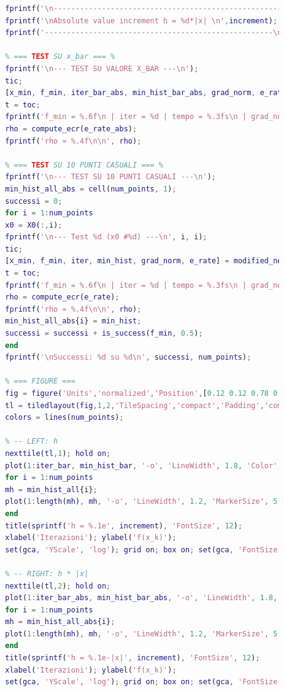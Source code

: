 \documentclass[a4paper,12pt]{article}
\begin{document}
\begin{lstlisting}[language=Matlab,caption={Full script: Modified Newton method on Extended Rosenbrock},label={lst:rosenbrock-extended}]
		% Absolute value increment
		fprintf('\n----------------------------------------------------');
		fprintf('\nAbsolute value increment h = %d*|x| \n',increment);
		fprintf('----------------------------------------------------\n');
		
		% === TEST SU x_bar === %
		fprintf('\n--- TEST SU VALORE X_BAR ---\n');
		tic;
		[x_min, f_min, iter_bar_abs, min_hist_bar_abs, grad_norm, e_rate_abs] = modified_newton(extended_rosenbrock,grad_f,hess_f,x_bar,tol,max_iter,fd,increment,1);
		t = toc;
		fprintf('f_min = %.6f\n | iter = %d | tempo = %.3fs\n | grad_norm = %.6f\n', f_min, iter_bar_abs, t, grad_norm);
		rho = compute_ecr(e_rate_abs); 
		fprintf('rho ≈ %.4f\n\n', rho);
		
		% === TEST SU 10 PUNTI CASUALI === %
		fprintf('\n--- TEST SU 10 PUNTI CASUALI ---\n');
		min_hist_all_abs = cell(num_points, 1);
		successi = 0;
		for i = 1:num_points
		x0 = X0(:,i);
		fprintf('\n--- Test %d (x0 #%d) ---\n', i, i);
		tic;
		[x_min, f_min, iter, min_hist, grad_norm, e_rate] = modified_newton(extended_rosenbrock,grad_f,hess_f,x0,tol,max_iter,fd,increment,1);
		t = toc;
		fprintf('f_min = %.6f\n | iter = %d | tempo = %.3fs\n | grad_norm = %.6f\n', f_min, iter, t, grad_norm);
		rho = compute_ecr(e_rate); 
		fprintf('rho ≈ %.4f\n\n', rho);
		min_hist_all_abs{i} = min_hist;
		successi = successi + is_success(f_min, 0.5);
		end   
		fprintf('\nSuccessi: %d su %d\n', successi, num_points);
		
		% === FIGURE ===
		fig = figure('Units','normalized','Position',[0.12 0.12 0.78 0.62]);
		tl = tiledlayout(fig,1,2,'TileSpacing','compact','Padding','compact');
		colors = lines(num_points);
		
		% -- LEFT: h 
		nexttile(tl,1); hold on;
		plot(1:iter_bar, min_hist_bar, '-o', 'LineWidth', 1.8, 'Color', 'k', 'DisplayName', 'x̄');
		for i = 1:num_points
		mh = min_hist_all{i};
		plot(1:length(mh), mh, '-o', 'LineWidth', 1.2, 'MarkerSize', 5, 'Color', colors(i,:), 'DisplayName', sprintf('x₀ #%d', i));
		end
		title(sprintf('h = %.1e', increment), 'FontSize', 12);
		xlabel('Iterazioni'); ylabel('f(x_k)');
		set(gca, 'YScale', 'log'); grid on; box on; set(gca, 'FontSize', 11);
		
		% -- RIGHT: h * |x|
		nexttile(tl,2); hold on;
		plot(1:iter_bar_abs, min_hist_bar_abs, '-o', 'LineWidth', 1.8, 'Color', 'k', 'DisplayName', 'x̄');
		for i = 1:num_points
		mh = min_hist_all_abs{i};
		plot(1:length(mh), mh, '-o', 'LineWidth', 1.2, 'MarkerSize', 5, 'Color', colors(i,:), 'DisplayName', sprintf('x₀ #%d', i));
		end
		title(sprintf('h = %.1e·|x|', increment), 'FontSize', 12);
		xlabel('Iterazioni'); ylabel('f(x_k)');
		set(gca, 'YScale', 'log'); grid on; box on; set(gca, 'FontSize', 11);
		

\end{lstlisting}
\end{document}
